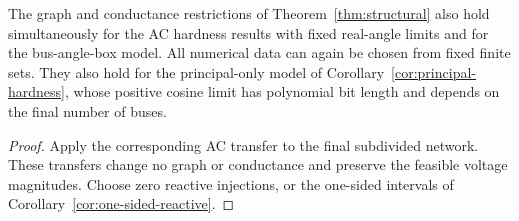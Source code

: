 \begin{corollary}
\label{cor:structural-ac}
The graph and conductance restrictions of Theorem~\ref{thm:structural}
also hold simultaneously for the AC hardness results with fixed real-angle
limits and for the bus-angle-box model. All numerical data can again be
chosen from fixed finite sets. They also hold for the principal-only model
of Corollary~\ref{cor:principal-hardness}, whose positive cosine limit has
polynomial bit length and depends on the final number of buses.
\end{corollary}
\begin{proof}
Apply the corresponding AC transfer to the final subdivided network.
These transfers change no graph or conductance and preserve the feasible
voltage magnitudes. Choose zero reactive injections, or the one-sided
intervals of Corollary~\ref{cor:one-sided-reactive}.
\end{proof}
